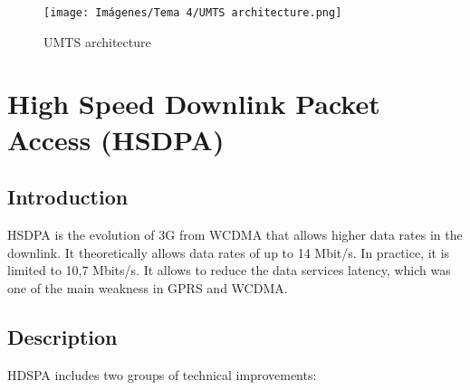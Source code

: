 \documentclass[
	12pt,
	twoside
]{book}
\begin{document}
\begin{figure}[H]
	\centering
	\texttt{[image: Imágenes/Tema 4/UMTS architecture.png]}
	\caption{
		\label{fig:unit4_UMTS_arch}
		UMTS architecture
	}
\end{figure}

\section{High Speed Downlink Packet Access (HSDPA)}

\subsection{Introduction}

HSDPA is the evolution of 3G from WCDMA that allows higher data rates in the downlink. It theoretically allows data rates of up to 14 Mbit/s. In practice, it is limited to 10,7 Mbits/s. It allows to reduce the data services latency, which was one of the main weakness in GPRS and WCDMA.

\subsection{Description}

HDSPA includes two groups of technical improvements:
\end{document}

